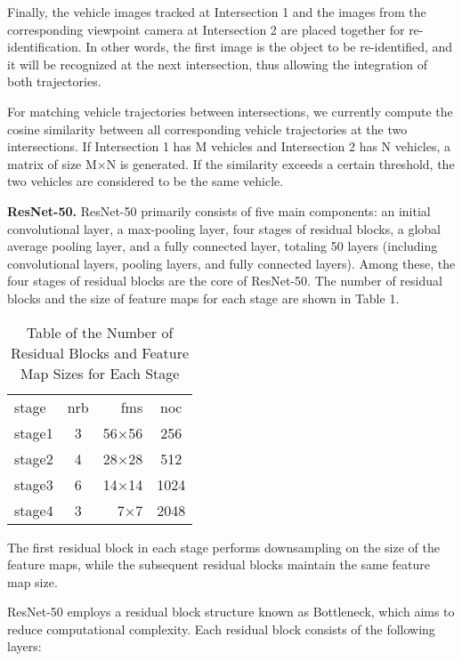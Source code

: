 Finally, the vehicle images tracked at Intersection 1 and the images from the corresponding viewpoint camera at Intersection 2 are placed together for re-identification. 
In other words, the first image is the object to be re-identified, and it will be recognized at the next intersection, thus allowing the integration of both trajectories.

For matching vehicle trajectories between intersections, we currently compute the cosine similarity between all corresponding vehicle trajectories at the two intersections. 
If Intersection 1 has M vehicles and Intersection 2 has N vehicles, a matrix of size M×N is generated. 
If the similarity exceeds a certain threshold, the two vehicles are considered to be the same vehicle.

\textbf{ResNet-50.}
ResNet-50 primarily consists of five main components: an initial convolutional layer, a max-pooling layer, four stages of residual blocks, a global average pooling layer, and a fully connected layer, totaling 50 layers (including convolutional layers, pooling layers, and fully connected layers). 
Among these, the four stages of residual blocks are the core of ResNet-50. 
The number of residual blocks and the size of feature maps for each stage are shown in Table 1.

\begin{table}[t] %
	\centering %
	\caption{Table of the Number of Residual Blocks and Feature Map Sizes for Each Stage} %
	\label{tab:grades} %
	\begin{tabular}{|l|c|r|c|}
		\hline
		stage & nrb & fms & noc \\ 
		stage1 & 3 & 56$\times$56 & 256 \\ 
		stage2 & 4 & 28$\times$28 & 512 \\ 
		stage3 & 6 & 14$\times$14 & 1024 \\
		stage4 & 3 & 7$\times$7 & 2048 \\
	\end{tabular}
\end{table}

The first residual block in each stage performs downsampling on the size of the feature maps, while the subsequent residual blocks maintain the same feature map size.

ResNet-50 employs a residual block structure known as Bottleneck, which aims to reduce computational complexity. 
Each residual block consists of the following layers:

